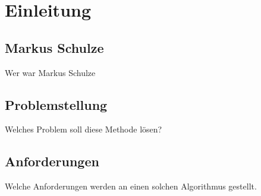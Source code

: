 \section{Einleitung}
\label{sec:Einleitung}


\subsection{Markus Schulze} 
\label{sec:markusSchulze}
Wer war Markus Schulze


\subsection{Problemstellung} 
\label{sec:problemstellung}
Welches Problem soll diese Methode lösen?

\subsection{Anforderungen} 
\label{sec:anforderungen}
Welche Anforderungen werden an einen solchen Algorithmus gestellt.





